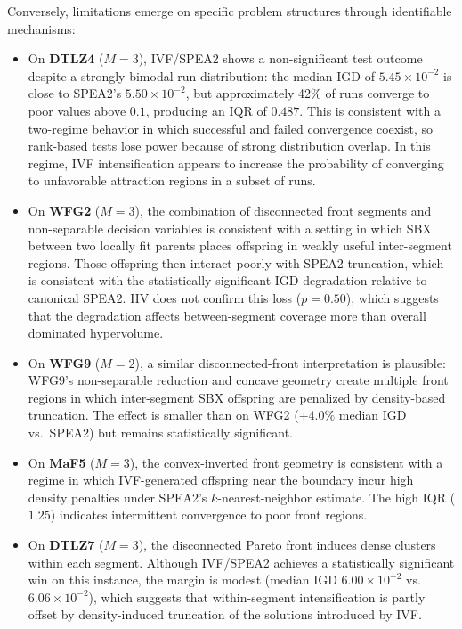 \documentclass[pdflatex,sn-mathphys-ay]{sn-jnl}%
\theoremstyle{thmstyleone}%
\theoremstyle{thmstyletwo}%
\theoremstyle{thmstylethree}%
\begin{document}
Conversely, limitations emerge on specific problem structures through identifiable mechanisms:
\begin{itemize}
	\item On \textbf{DTLZ4} ($M=3$), IVF/SPEA2 shows a non-significant test outcome despite a strongly bimodal run distribution: the median IGD of $5.45 \times 10^{-2}$ is close to SPEA2's $5.50 \times 10^{-2}$, but approximately 42\% of runs converge to poor values above $0.1$, producing an IQR of $0.487$. This is consistent with a two-regime behavior in which successful and failed convergence coexist, so rank-based tests lose power because of strong distribution overlap. In this regime, IVF intensification appears to increase the probability of converging to unfavorable attraction regions in a subset of runs.
	\item On \textbf{WFG2} ($M=3$), the combination of disconnected front segments and non-separable decision variables is consistent with a setting in which SBX between two locally fit parents places offspring in weakly useful inter-segment regions. Those offspring then interact poorly with SPEA2 truncation, which is consistent with the statistically significant IGD degradation relative to canonical SPEA2. HV does not confirm this loss ($p=0.50$), which suggests that the degradation affects between-segment coverage more than overall dominated hypervolume.
	\item On \textbf{WFG9} ($M=2$), a similar disconnected-front interpretation is plausible: WFG9's non-separable reduction and concave geometry create multiple front regions in which inter-segment SBX offspring are penalized by density-based truncation. The effect is smaller than on WFG2 ($+4.0\%$ median IGD vs.\ SPEA2) but remains statistically significant.
	\item On \textbf{MaF5} ($M=3$), the convex-inverted front geometry is consistent with a regime in which IVF-generated offspring near the boundary incur high density penalties under SPEA2's $k$-nearest-neighbor estimate. The high IQR ($1.25$) indicates intermittent convergence to poor front regions.
	\item On \textbf{DTLZ7} ($M=3$), the disconnected Pareto front induces dense clusters within each segment. Although IVF/SPEA2 achieves a statistically significant win on this instance, the margin is modest (median IGD $6.00 \times 10^{-2}$ vs.\ $6.06 \times 10^{-2}$), which suggests that within-segment intensification is partly offset by density-induced truncation of the solutions introduced by IVF.
\end{itemize}
\end{document}
